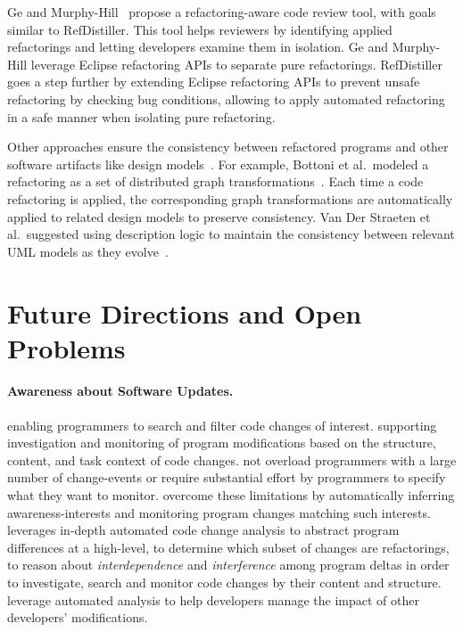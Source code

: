 \documentclass[runningheads,a4paper]{llncs}
\begin{document}
Ge and Murphy-Hill~\cite{emersoncodereview:2014chase} propose a refactoring-aware code review tool, with goals similar to RefDistiller. This tool helps reviewers by identifying applied refactorings and letting developers examine them in isolation. Ge and Murphy-Hill leverage Eclipse refactoring APIs to separate pure refactorings. RefDistiller goes a step further by extending Eclipse refactoring APIs to prevent unsafe refactoring by checking bug conditions, allowing to apply automated refactoring in a safe manner when isolating pure refactoring. 


Other approaches ensure the consistency between refactored programs and other software artifacts like design models~\cite{Bottoni2003:coordinatedTransformation,Straeten2003:UML}. For example, Bottoni et al.~modeled a refactoring as a set of distributed graph transformations~\cite{Bottoni2003:coordinatedTransformation}. Each time a code refactoring is applied, the corresponding graph transformations are automatically applied to related design models to preserve consistency. Van Der Straeten et al.~suggested using description logic to maintain the consistency between relevant UML models as they evolve~\cite{Straeten2003:UML}.


\section{Future Directions and Open Problems} 

\paragraph{Awareness about Software Updates.} 
enabling programmers to search and filter code changes of interest. 
supporting investigation and monitoring of program modifications based on the structure, content, and task context of code changes.
not overload programmers with a large number of change-events or require substantial effort by programmers to specify what they want to monitor. 
overcome these limitations by automatically inferring awareness-interests and monitoring program changes matching such interests. 
leverages in-depth automated code change analysis to abstract program differences at a high-level, to determine which subset of changes are refactorings, to reason about {\em interdependence} and {\em interference} among program deltas in order to investigate, search and monitor code changes by their content and structure.  
leverage automated analysis to help developers manage the impact of other developers' modifications. 
\end{document}
